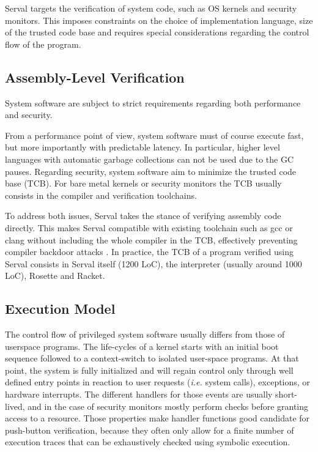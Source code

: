 \documentclass[11pt,a4paper,runningheads]{llncs}
\newcommand{\ie}{\textit{i.e.}\xspace}
\newcommand{\racket}{\textsf{Racket}\xspace}
\newcommand{\rosette}{\textsf{Rosette}\xspace}
\newcommand{\gcc}{\textsf{gcc}\xspace}
\newcommand{\cclang}{\textsf{clang}\xspace}
\begin{document}
Serval targets the verification of system code, such as OS kernels and security
monitors.
This imposes constraints on the choice of implementation language, size of the
trusted code base and requires special considerations regarding the control flow
of the program.

\subsection{Assembly-Level Verification}

System software are subject to strict requirements regarding both performance
and security.

From a performance point of view, system software must of course execute fast,
but more importantly with predictable latency.
In particular, higher level languages with automatic garbage collections can not
be used due to the GC pauses.
Regarding security, system software aim to minimize the trusted code base (TCB).
For bare metal kernels or security monitors the TCB usually consists in the
compiler and verification toolchains.

To address both issues, Serval takes the stance of verifying assembly code
directly.
This makes Serval compatible with existing toolchain such as \gcc{} or \cclang{}
without including the whole compiler in the TCB, effectively preventing compiler
backdoor attacks \cite{trustingtrust}.
In practice, the TCB of a program verified using Serval consists in Serval
itself (1200 LoC), the interpreter (usually around 1000 LoC), \rosette{} and
\racket{}.

\subsection{Execution Model}

The control flow of privileged system software usually differs from those of
userspace programs.
The life-cycles of a kernel starts with an initial boot sequence followed to
a context-switch to isolated user-space programs.
At that point, the system is fully initialized and will regain control only
through well defined entry points in reaction to user requests (\ie system
calls), exceptions, or hardware interrupts.
The different handlers for those events are usually short-lived, and in the case
of security monitors mostly perform checks before granting access to a resource.
Those properties make handler functions good candidate for push-button
verification, because they often only allow for a finite number of execution
traces that can be exhaustively checked using symbolic execution.
\end{document}
